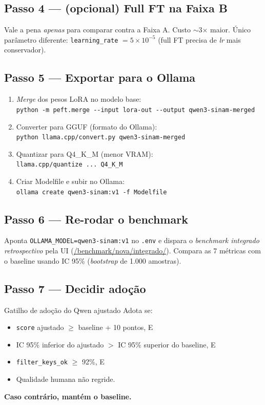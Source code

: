 \documentclass[11pt,a4paper]{article}
\newcommand{\code}[1]{\texttt{\small #1}}
\begin{document}
\subsection{Passo 4 --- (opcional) Full FT na Faixa B}

Vale a pena \emph{apenas} para comparar contra a Faixa A. Custo
$\sim$3$\times$ maior. Único parâmetro diferente: \code{learning\_rate}
$= 5 \times 10^{-5}$ (full FT precisa de \emph{lr} mais conservador).

\subsection{Passo 5 --- Exportar para o Ollama}

\begin{enumerate}[leftmargin=*]
\item \emph{Merge} dos pesos LoRA no modelo base:\\
\code{python -m peft.merge -{}-input lora-out -{}-output qwen3-sinam-merged}
\item Converter para GGUF (formato do Ollama):\\
\code{python llama.cpp/convert.py qwen3-sinam-merged}
\item Quantizar para Q4\_K\_M (menor VRAM):\\
\code{llama.cpp/quantize ... Q4\_K\_M}
\item Criar Modelfile e subir no Ollama:\\
\code{ollama create qwen3-sinam:v1 -f Modelfile}
\end{enumerate}

\subsection{Passo 6 --- Re-rodar o benchmark}

Aponta \code{OLLAMA\_MODEL=qwen3-sinam:v1} no \code{.env} e dispara o
\emph{benchmark integrado retrospectivo} pela UI
(\url{/benchmark/nova/integrado/}). Compara as 7 métricas com o
baseline usando IC 95\% (\emph{bootstrap} de 1.000 amostras).

\subsection{Passo 7 --- Decidir adoção}

\begin{infobox}{Gatilho de adoção do Qwen ajustado}
Adota se:
\begin{itemize}[leftmargin=*]
\item \code{score} ajustado $\ge$ baseline + 10 pontos, E
\item IC 95\% inferior do ajustado $>$ IC 95\% superior do baseline, E
\item \code{filter\_keys\_ok} $\ge$ 92\%, E
\item Qualidade humana não regride.
\end{itemize}
\textbf{Caso contrário, mantém o baseline.}
\end{infobox}
\end{document}
